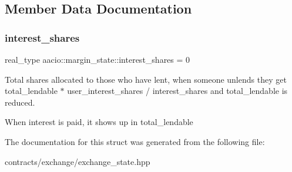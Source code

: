 \subsection{Member Data Documentation}
\mbox{\label{structaacio_1_1margin__state_ac4e28861b6e34e7845742965ba824771}} 
\subsubsection{\texorpdfstring{interest\+\_\+shares}{interest\_shares}}
{\footnotesize\ttfamily real\+\_\+type aacio\+::margin\+\_\+state\+::interest\+\_\+shares = 0}

Total shares allocated to those who have lent, when someone unlends they get total\+\_\+lendable $\ast$ user\+\_\+interest\+\_\+shares / interest\+\_\+shares and total\+\_\+lendable is reduced.

When interest is paid, it shows up in total\+\_\+lendable 

The documentation for this struct was generated from the following file\+:\begin{DoxyCompactItemize}
\item 
contracts/exchange/exchange\+\_\+state.\+hpp\end{DoxyCompactItemize}
